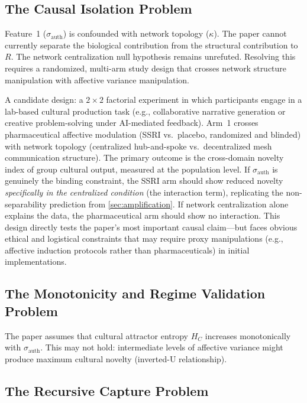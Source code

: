 \documentclass[11pt, a4paper]{article}
\theoremstyle{remark}
\begin{document}
\subsection{The Causal Isolation Problem}\label{sec:lim-isolation}

Feature~1 ($\sigma_{\text{auth}}$) is confounded with network topology ($\kappa$). The paper cannot currently separate the biological contribution from the structural contribution to $R$. The network centralization null hypothesis remains unrefuted. Resolving this requires a randomized, multi-arm study design that crosses network structure manipulation with affective variance manipulation.

A candidate design: a $2 \times 2$ factorial experiment in which participants engage in a lab-based cultural production task (e.g., collaborative narrative generation or creative problem-solving under AI-mediated feedback). Arm~1 crosses pharmaceutical affective modulation (SSRI vs.\ placebo, randomized and blinded) with network topology (centralized hub-and-spoke vs.\ decentralized mesh communication structure). The primary outcome is the cross-domain novelty index of group cultural output, measured at the population level. If $\sigma_{\text{auth}}$ is genuinely the binding constraint, the SSRI arm should show reduced novelty \textit{specifically in the centralized condition} (the interaction term), replicating the non-separability prediction from \cref{sec:amplification}. If network centralization alone explains the data, the pharmaceutical arm should show no interaction. This design directly tests the paper's most important causal claim---but faces obvious ethical and logistical constraints that may require proxy manipulations (e.g., affective induction protocols rather than pharmaceuticals) in initial implementations.

\subsection{The Monotonicity and Regime Validation Problem}\label{sec:lim-monotonicity}

The paper assumes that cultural attractor entropy $H_C$ increases monotonically with $\sigma_{\text{auth}}$. This may not hold: intermediate levels of affective variance might produce maximum cultural novelty (inverted-U relationship).

\subsection{The Recursive Capture Problem}\label{sec:lim-recursive}
\end{document}
